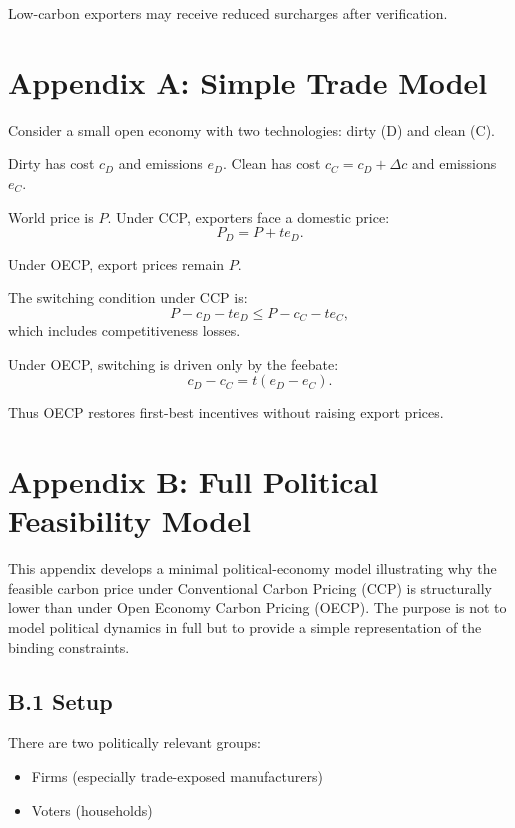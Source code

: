 \documentclass[12pt]{article}
\begin{document}
Low-carbon exporters may receive reduced surcharges after verification.

\appendix

\section{Appendix A: Simple Trade Model}
Consider a small open economy with two technologies: dirty (D) and clean (C).

Dirty has cost $c_D$ and emissions $e_D$. Clean has cost $c_C = c_D + \Delta c$ and emissions $e_C$.

World price is $P$. Under CCP, exporters face a domestic price:
\begin{equation}
P_D = P + t e_D.
\end{equation}

Under OECP, export prices remain $P$.

The switching condition under CCP is:
\begin{equation}
P - c_D - t e_D \le P - c_C - t e_C,
\end{equation}
which includes competitiveness losses.

Under OECP, switching is driven only by the feebate:
\begin{equation}
c_D - c_C = t (e_D - e_C).
\end{equation}

Thus OECP restores first-best incentives without raising export prices.

\section*{Appendix B: Full Political Feasibility Model}


This appendix develops a minimal political-economy model illustrating why the feasible carbon price under Conventional Carbon Pricing (CCP) is structurally lower than under Open Economy Carbon Pricing (OECP). The purpose is not to model political dynamics in full but to provide a simple representation of the binding constraints.


\subsection*{B.1 Setup}


There are two politically relevant groups:
\begin{itemize}
\item Firms (especially trade-exposed manufacturers)
\item Voters (households)
\end{itemize}
\end{document}
